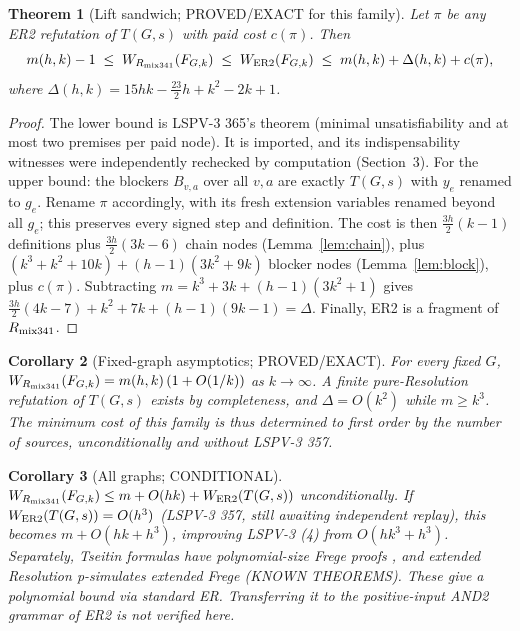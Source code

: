 \documentclass[11pt]{article}
\newtheorem{theorem}{Theorem}
\newtheorem{corollary}[theorem]{Corollary}
\begin{document}
\begin{theorem}[Lift sandwich; PROVED/EXACT for this family]\label{thm:sandwich}
Let $\pi$ be any ER2 refutation of $T(G,s)$ with paid cost $c(\pi)$. Then
\[
m(h,k)-1\;\le\;W_{R_{\rm mix341}}(F_{G,k})\;\le\;W_{\rm ER2}(F_{G,k})\;\le\;m(h,k)+\Delta(h,k)+c(\pi),
\]
where $\Delta(h,k)=15hk-\tfrac{23}{2}h+k^2-2k+1$.
\end{theorem}
\begin{proof}
The lower bound is LSPV-3 365's theorem (minimal unsatisfiability and at most two premises per paid node). It is imported, and its indispensability witnesses were independently rechecked by computation (Section~3). For the upper bound: the blockers $B_{v,a}$ over all $v,a$ are exactly $T(G,s)$ with $y_e$ renamed to $g_e$. Rename $\pi$ accordingly, with its fresh extension variables renamed beyond all $g_e$; this preserves every signed step and definition. The cost is then $\frac{3h}{2}(k-1)$ definitions plus $\frac{3h}{2}(3k-6)$ chain nodes (Lemma~\ref{lem:chain}), plus $(k^3+k^2+10k)+(h-1)(3k^2+9k)$ blocker nodes (Lemma~\ref{lem:block}), plus $c(\pi)$. Subtracting $m=k^3+3k+(h-1)(3k^2+1)$ gives $\frac{3h}{2}(4k-7)+k^2+7k+(h-1)(9k-1)=\Delta$. Finally, ER2 is a fragment of $R_{\rm mix341}$.
\end{proof}

\begin{corollary}[Fixed-graph asymptotics; PROVED/EXACT]
For every fixed $G$, $W_{R_{\rm mix341}}(F_{G,k})=m(h,k)\,(1+O(1/k))$ as $k\to\infty$. A finite pure-Resolution refutation of $T(G,s)$ exists by completeness, and $\Delta=O(k^2)$ while $m\ge k^3$. The minimum cost of this family is thus determined to first order by the number of sources, unconditionally and without LSPV-3 357.
\end{corollary}

\begin{corollary}[All graphs; CONDITIONAL]
$W_{R_{\rm mix341}}(F_{G,k})\le m+O(hk)+W_{\rm ER2}(T(G,s))$ unconditionally. If $W_{\rm ER2}(T(G,s))=O(h^3)$ (LSPV-3 357, still awaiting independent replay), this becomes $m+O(hk+h^3)$, improving LSPV-3 (4) from $O(hk^3+h^3)$. Separately, Tseitin formulas have polynomial-size Frege proofs \cite{Urq}, and extended Resolution p-simulates extended Frege \cite{CR} (KNOWN THEOREMS). These give a polynomial bound via standard ER. Transferring it to the positive-input AND2 grammar of ER2 is not verified here.
\end{corollary}
\end{document}
